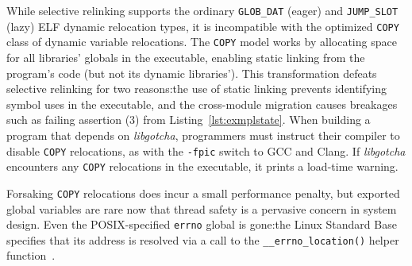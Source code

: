 While selective relinking supports the ordinary \texttt{GLOB\_DAT} (eager) and
\texttt{JUMP\_SLOT} (lazy) ELF dynamic relocation types, it is incompatible with the
optimized \texttt{COPY} class of dynamic variable relocations.  The \texttt{COPY}
model works by allocating space for all libraries' globals in the executable,
enabling static linking from the program's code (but not its dynamic libraries').
This transformation defeats selective relinking for two reasons:\@ the use of static
linking prevents identifying symbol uses in the executable, and the cross-module
migration causes breakages such as failing assertion (3) from
Listing~\ref{lst:exmplstate}.  When building a program that depends on
\textit{libgotcha}, programmers must instruct their compiler to disable \texttt{COPY}
relocations, as with the \texttt{-fpic} switch to GCC and Clang.  If
\textit{libgotcha} encounters any \texttt{COPY} relocations in the executable, it
prints a load-time warning.

Forsaking \texttt{COPY} relocations does incur a small performance penalty, but
exported global variables are rare now that thread safety is a pervasive concern in
system design.  Even the POSIX-specified \texttt{errno} global is gone:\@ the Linux
Standard Base specifies that its address is resolved via a call to the
\texttt{\_\_errno\_location()} helper function~\cite{www-lsb-errno}.

